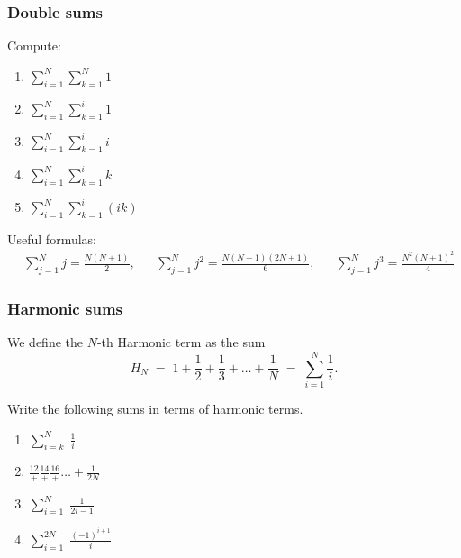 \documentclass[14pt]{beamer}
\newcommand{\setsize}[1]{\fontsize{#1}{#1}\selectfont} %
\newcommand{\smallerfont}{\setsize{13}} %
\begin{document}
	\begin{frame}[t]
		\frametitle{Double sums}

		Compute:
		\begin{multicols}{3}
			\begin{enumerate}
				\item ${\displaystyle \sum_{i=1}^{N} \sum_{k=1}^N 1 }$

				\item ${\displaystyle  \sum_{i=1}^{N} \sum_{k=1}^{i} 1}$

				\item ${\displaystyle  \sum_{i=1}^{N} \sum_{k=1}^{i} i}$

				\item ${\displaystyle  \sum_{i=1}^{N} \sum_{k=1}^i k }$

				\item ${\displaystyle  \sum_{i=1}^{N} \sum_{k=1}^i (ik) }$
			\end{enumerate}
		\end{multicols}

		\vfill

		{\setsize{10} Useful formulas: \begin{align*}&\sum_{j=1}^{N}j = \frac{N(N+1)}{2},&&\sum_{j=1}^{N} j^{2} = \frac{N(N+1)(2N+1)}{6},&&\sum_{j=1}^{N}j^{3} = \frac{N^{2}(N+1)^{2}}{4}\end{align*} }
	\end{frame}
	\begin{frame}[t]
		\smallerfont
		\frametitle{Harmonic sums}

		We define the $N$-th Harmonic term as the sum
		\[
			H_{N} \; = \; 1 + \frac{1}{2} + \frac{1}{3} + \ldots + \frac{1}{N} \; = \;
			\sum_{i=1}^{N}\frac{1}{i}.
		\]

		Write the following sums in terms of harmonic terms.

		\begin{multicols}{2}
			\begin{enumerate}
				\item ${\displaystyle \sum_{i=k}^{N} \; \frac{1}{i}}$

				\item ${\displaystyle \frac{12}{+} \frac{14}{+} \frac{16}{+} \ldots + \frac{1}{2N}}$

				\item ${\displaystyle \sum_{i=1}^{N} \; \frac{1}{2i-1}}$

				\item ${\displaystyle \sum_{i=1}^{2N} \; \frac{(-1)^{i+1}}{i}}$
			\end{enumerate}
		\end{multicols}
	\end{frame}
\end{document}
